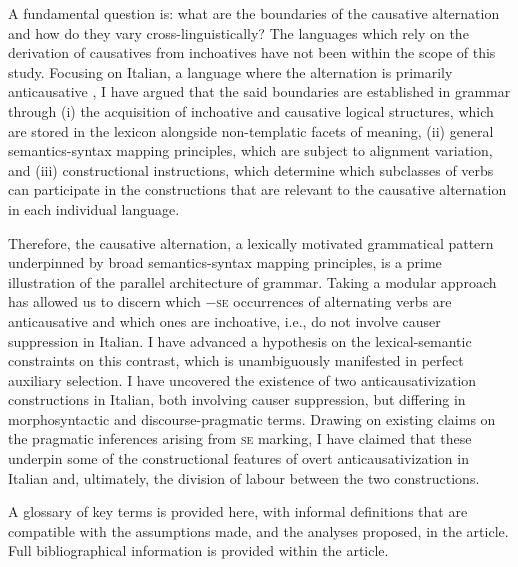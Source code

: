 \documentclass[output=paper,colorlinks,citecolor=brown
]{langscibook}
\begin{document}
A fundamental question is: what are the boundaries of the causative alternation and how do they vary cross-linguistically? The languages which rely on the derivation of causatives from inchoatives have not been within the scope of this study. Focusing on Italian, a language where the alternation is primarily anticausative \citep{haspelmath1993more}, I have argued that the said boundaries are established in grammar through (i) the acquisition of inchoative and causative logical structures, which are stored in the lexicon alongside non-templatic facets of meaning, (ii) general semantics-syntax mapping principles, which are subject to alignment variation, and (iii) constructional instructions, which determine which subclasses of verbs can participate in the constructions that are relevant to the causative alternation in each individual language.  

Therefore, the causative alternation, a lexically motivated grammatical pattern underpinned by broad semantics-syntax mapping principles, is a prime illustration of the parallel architecture of grammar. Taking a modular approach has allowed us to discern which −\textsc{se} occurrences of alternating verbs are anticausative and which ones are inchoative, i.e., do not involve causer suppression in Italian. I have advanced a hypothesis on the lexical-semantic constraints on this contrast, which is unambiguously manifested in perfect auxiliary selection. I have uncovered the existence of two anticausativization constructions in Italian, both involving causer suppression, but differing in morphosyntactic and discourse-pragmatic terms. Drawing on existing claims on the pragmatic inferences arising from \textsc{se} marking, I have claimed that these underpin some of the constructional features of overt anticausativization in Italian and, ultimately, the division of labour between the two constructions. 

\label{bentley:appendix:A}

A glossary of key terms is provided here, with informal definitions that are compatible with the assumptions made, and the analyses proposed, in the article. Full bibliographical information is provided within the article. 
\end{document}
